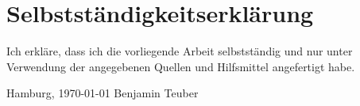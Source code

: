 \documentclass[11pt, a4paper, bibgerm]{book}
\begin{document}
\cleardoublepage





\listoffigures
{}

\chapter*{Selbstständigkeitserklärung}

Ich erkläre, dass ich die vorliegende Arbeit selbstständig und nur unter
Verwendung der angegebenen Quellen und Hilfsmittel angefertigt habe.
\vskip 2cm
\begin{flushright}
Hamburg, \today
\vskip 1cm
Benjamin Teuber
\end{flushright}
\end{document}
